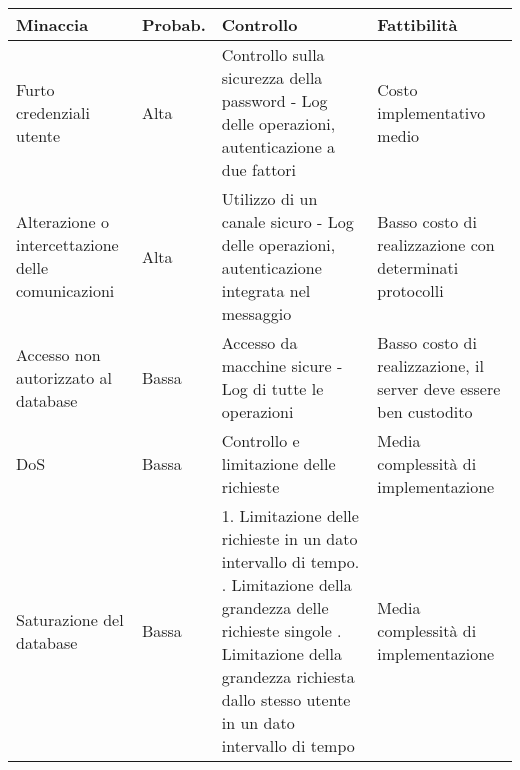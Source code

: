 \begin{tabular} {|P{3cm}|P{2cm}|P{6.1cm}|P{4cm}|}
  \hline
  \textbf{Minaccia}                                 & \textbf{Probab.} & \textbf{Controllo}                                                                                                                                                                                                                      & \textbf{Fattibilità}                                              \\
  \hline
  Furto credenziali utente                          & Alta             & Controllo sulla sicurezza della password - Log delle operazioni, autenticazione a due fattori                                                                                                                                           & Costo implementativo medio                                        \\
  \hline
  Alterazione o intercettazione delle comunicazioni & Alta             & Utilizzo di un canale sicuro - Log delle operazioni, autenticazione integrata nel messaggio                                                                                                                                             & Basso costo di realizzazione con determinati protocolli           \\
  \hline
  Accesso non autorizzato al database               & Bassa            & Accesso da macchine sicure - Log di tutte le operazioni                                                                                                                                                                                 & Basso costo di realizzazione, il server deve essere ben custodito \\
  \hline
  DoS                                               & Bassa            & Controllo e limitazione delle richieste                                                                                                                                                                                                 & Media complessità di implementazione                              \\
  \hline
  Saturazione del database                          & Bassa            & 1. Limitazione delle richieste in un dato intervallo di tempo. . Limitazione della grandezza delle richieste singole . Limitazione della grandezza richiesta dallo stesso utente in un dato intervallo di tempo & Media complessità di implementazione                              \\
  \hline
\end{tabular}

